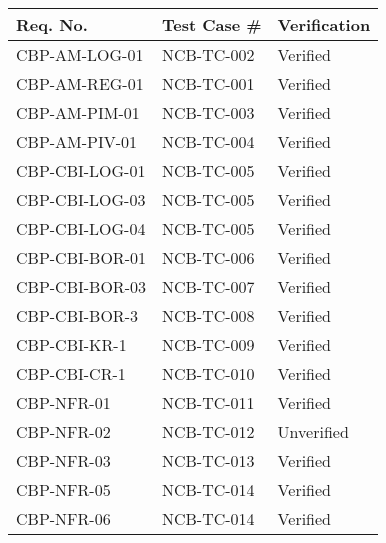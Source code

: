 \documentclass{article}
\begin{document}
\begin{tabularx}{\textwidth}{| X | X | X |}
	\hline
	Req. No.       & Test Case \# & Verification \\ \hline
	CBP-AM-LOG-01  & NCB-TC-002   & Verified     \\ \hline
	CBP-AM-REG-01  & NCB-TC-001   & Verified     \\ \hline
	CBP-AM-PIM-01  & NCB-TC-003   & Verified     \\ \hline
	CBP-AM-PIV-01  & NCB-TC-004   & Verified     \\ \hline
	CBP-CBI-LOG-01 & NCB-TC-005   & Verified     \\ \hline
	CBP-CBI-LOG-03 & NCB-TC-005   & Verified     \\ \hline
	CBP-CBI-LOG-04 & NCB-TC-005   & Verified     \\ \hline
	CBP-CBI-BOR-01 & NCB-TC-006   & Verified     \\ \hline
	CBP-CBI-BOR-03 & NCB-TC-007   & Verified     \\ \hline
	CBP-CBI-BOR-3  & NCB-TC-008   & Verified     \\ \hline
	CBP-CBI-KR-1   & NCB-TC-009   & Verified     \\ \hline
	CBP-CBI-CR-1   & NCB-TC-010   & Verified     \\ \hline
	CBP-NFR-01     & NCB-TC-011   & Verified     \\ \hline
	CBP-NFR-02     & NCB-TC-012   & Unverified   \\ \hline
	CBP-NFR-03     & NCB-TC-013   & Verified     \\ \hline
	CBP-NFR-05     & NCB-TC-014   & Verified     \\ \hline
	CBP-NFR-06     & NCB-TC-014   & Verified     \\ \hline
\end{tabularx}
\end{document}
